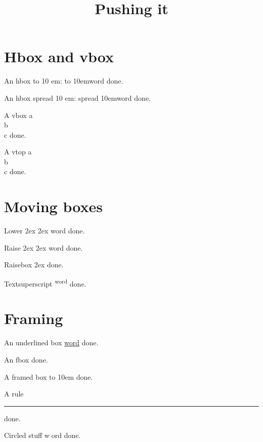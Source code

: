 \documentclass{article}
\title{Pushing it}
\begin{document}
\section{Hbox and vbox}
\par\noindent
An hbox to 10 em: \hbox to 10em{word} done.

\par\noindent
An hbox spread 10 em: \hbox spread 10em{word} done.

\par\noindent
A vbox \vbox{a\\b\\c} done.

\par\noindent
A vtop \vbox{a\\b\\c} done.

\section{Moving boxes}


\par\noindent
Lower 2ex \lower 2ex \hbox{word} done.

\par\noindent
Raise 2ex \raise 2ex \hbox{word} done.

\par\noindent
Raisebox 2ex \raisebox{2ex}{word} done.

\par\noindent
Textsuperscript \textsuperscript{word} done.

\section{Framing}
\par\noindent
An underlined box \underline{word} done.

\par\noindent
An fbox  done.

\par\noindent
A framed box to 10em  done.

\par\noindent
A rule \rule[1ex]{1em}{1ex} done.

\par\noindent
Circled stuff \textcircled{word} done.
\end{document}
